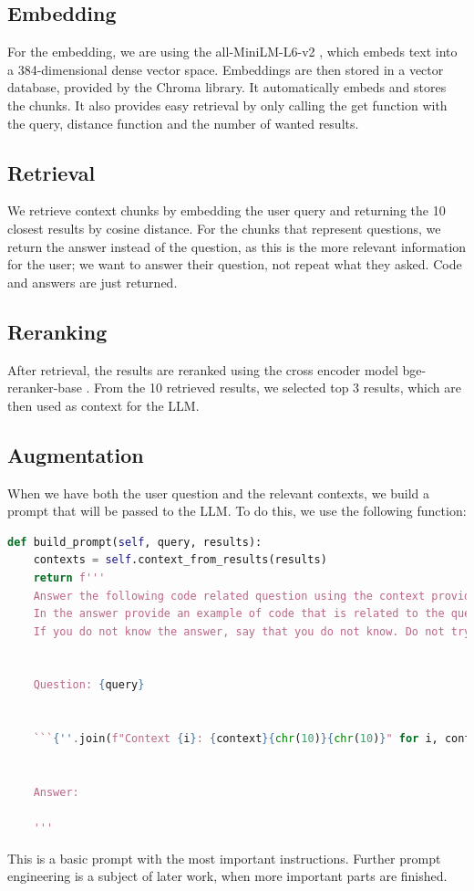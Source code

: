 \documentclass[fleqn,moreauthors,10pt]{ds_report}
\begin{document}
\subsection*{Embedding}
For the embedding, we are using the all-MiniLM-L6-v2 \cite{miniLM}, which embeds text into a 384-dimensional dense vector space. Embeddings are then stored in a vector database, provided by the Chroma \cite{chroma} library. It automatically embeds and stores the chunks. It also provides easy retrieval by only calling the get function with the query, distance function and the number of wanted results. 

\subsection*{Retrieval}
We retrieve context chunks by embedding the user query and returning the 10 closest results by cosine distance. For the chunks that represent questions, we return the answer instead of the question, as this is the more relevant information for the user; we want to answer their question, not repeat what they asked. Code and answers are just returned. 

\subsection*{Reranking}
After retrieval, the results are reranked using the cross encoder model bge-reranker-base \cite{reranker_model}. From the 10 retrieved results, we selected top 3 results, which are then used as context for the LLM.

\subsection*{Augmentation}
When we have both the user question and the relevant contexts, we build a prompt that will be passed to the LLM. To do this, we use the following function:
\begin{lstlisting}[language=Python]
def build_prompt(self, query, results):
    contexts = self.context_from_results(results)
    return f'''
    Answer the following code related question using the context provided inside triple qoutes in it is useful.
    In the answer provide an example of code that is related to the question.
    If you do not know the answer, say that you do not know. Do not try to invent the solution.
        

    Question: {query}


    ```{''.join(f"Context {i}: {context}{chr(10)}{chr(10)}" for i, context in enumerate(contexts))}```

        
    Answer:

    '''
\end{lstlisting}
This is a basic prompt with the most important instructions. Further prompt engineering is a subject of later work, when more important parts are finished.
\end{document}
